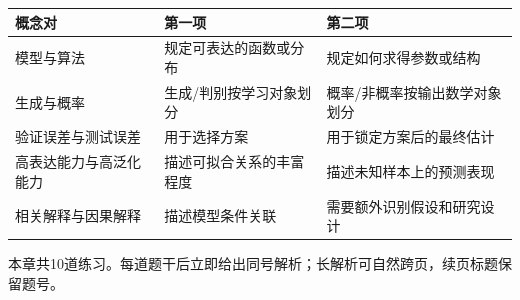 \label{struct:V3-C07-CH31}
\begin{comparisonbox}
\begin{tabularx}{\linewidth}{@{}l X X@{}}
\toprule 概念对 & 第一项 & 第二项\\ \midrule
模型与算法 & 规定可表达的函数或分布 & 规定如何求得参数或结构\\
生成与概率 & 生成/判别按学习对象划分 & 概率/非概率按输出数学对象划分\\
验证误差与测试误差 & 用于选择方案 & 用于锁定方案后的最终估计\\
高表达能力与高泛化能力 & 描述可拟合关系的丰富程度 & 描述未知样本上的预测表现\\
相关解释与因果解释 & 描述模型条件关联 & 需要额外识别假设和研究设计\\
\bottomrule
\end{tabularx}
\end{comparisonbox}


\label{struct:V3-C07-CH34}
\begin{chapterexercisebox}
\label{struct:V3-C07-CH35}
本章共10道练习。每道题干后立即给出同号解析；长解析可自然跨页，续页标题保留题号。
\end{chapterexercisebox}

